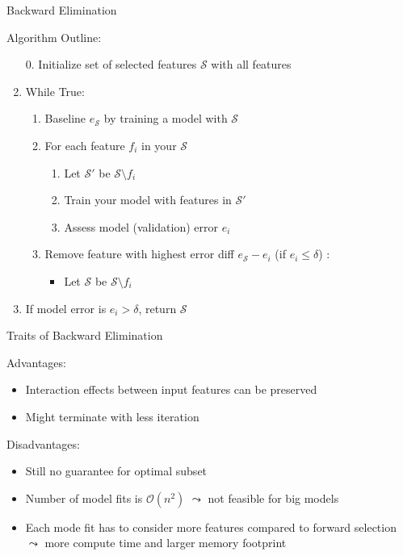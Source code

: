 \documentclass[aspectratio=169]{../latex_main/tntbeamer}  %
\begin{document}
	\begin{frame}[c]{Backward Elimination}

    Algorithm Outline:
    \begin{enumerate}
        \item[0.] Initialize set of selected features $\mathcal{S}$ with all features
        \item While True:
        \begin{enumerate}
            \item Baseline $e_\mathcal{S}$ by training a model with $\mathcal{S}$
            \item For each feature $f_i$ in your $\mathcal{S}$
            \begin{enumerate}
                \item Let $\mathcal{S}'$ be $\mathcal{S} \setminus f_i$
                \item Train your model with features in $\mathcal{S}'$
                \item Assess model (validation) error $e_i$
            \end{enumerate}
            \item Remove feature with highest error diff $e_\mathcal{S} - e_i$ (if $e_i \leq \delta$) : 
            \begin{itemize}
                \item Let $\mathcal{S}$ be  $\mathcal{S} \setminus f_i$
            \end{itemize}
        \end{enumerate}
        \item If model error is $e_i > \delta$, return $\mathcal{S}$
    \end{enumerate}

	\end{frame}
	
	\begin{frame}{Traits of Backward Elimination}
    
    Advantages:
    \begin{itemize}
        \item Interaction effects between input features can be preserved
        \item Might terminate with less iteration
    \end{itemize}

    Disadvantages:
    \begin{itemize}
        \item Still no guarantee for optimal subset
        \item Number of model fits is $\mathcal{O}(n^2)$ $\leadsto$ not feasible for big models
        \item Each mode fit has to consider more features compared to forward selection $\leadsto$ more compute time and larger memory footprint
    \end{itemize}

	\end{frame}
	
\end{document}
